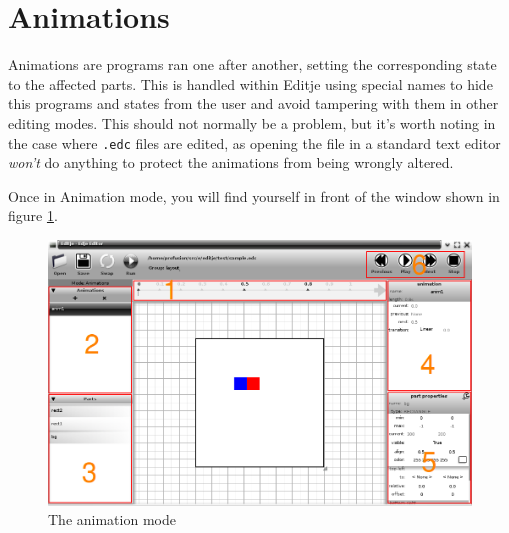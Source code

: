 \documentclass[a4paper]{profusion}
\begin{document}
\section{Animations}
\label{animation_editing}

Animations are programs ran one after another, setting the
corresponding state to the affected parts. This is handled within
Editje using special names to hide this programs and states from the
user and avoid tampering with them in other editing modes. This should
not normally be a problem, but it's worth noting in the case where
\texttt{.edc} files are edited, as opening the file in a standard text
editor \emph{won't} do anything to protect the animations from being
wrongly altered.

Once in Animation mode, you will find yourself in front of the window
shown in figure \ref{fig:animation_mode_numbers}.

\begin{figure}[h!]
  \centering
  \includegraphics[width=1.0\textwidth]{images/animation_mode_numbers.png}
  \caption{The animation mode}
  \label{fig:animation_mode_numbers}
\end{figure}
\end{document}
